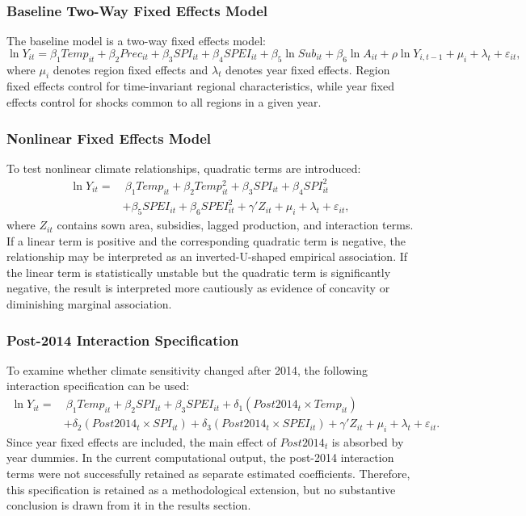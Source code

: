 \documentclass[12pt,a4paper]{article}
\begin{document}
\subsubsection{Baseline Two-Way Fixed Effects Model}

The baseline model is a two-way fixed effects model:
\[
\ln Y_{it}
=
\beta_1 Temp_{it}
+\beta_2 Prec_{it}
+\beta_3 SPI_{it}
+\beta_4 SPEI_{it}
+\beta_5 \ln Sub_{it}
+\beta_6 \ln A_{it}
+\rho \ln Y_{i,t-1}
+\mu_i+\lambda_t+\varepsilon_{it},
\]
where \(\mu_i\) denotes region fixed effects and \(\lambda_t\) denotes year fixed effects. Region fixed effects control for time-invariant regional characteristics, while year fixed effects control for shocks common to all regions in a given year.

\subsubsection{Nonlinear Fixed Effects Model}

To test nonlinear climate relationships, quadratic terms are introduced:
\[
\begin{aligned}
\ln Y_{it}
=&\ \beta_1 Temp_{it}
+\beta_2 Temp^2_{it}
+\beta_3 SPI_{it}
+\beta_4 SPI^2_{it} \\
&+\beta_5 SPEI_{it}
+\beta_6 SPEI^2_{it}
+\gamma'Z_{it}
+\mu_i+\lambda_t+\varepsilon_{it},
\end{aligned}
\]
where \(Z_{it}\) contains sown area, subsidies, lagged production, and interaction terms. If a linear term is positive and the corresponding quadratic term is negative, the relationship may be interpreted as an inverted-U-shaped empirical association. If the linear term is statistically unstable but the quadratic term is significantly negative, the result is interpreted more cautiously as evidence of concavity or diminishing marginal association.

\subsubsection{Post-2014 Interaction Specification}

To examine whether climate sensitivity changed after 2014, the following interaction specification can be used:
\[
\begin{aligned}
\ln Y_{it}
=&\ \beta_1 Temp_{it}
+\beta_2 SPI_{it}
+\beta_3 SPEI_{it}
+\delta_1(Post2014_t \times Temp_{it}) \\
&+\delta_2(Post2014_t \times SPI_{it})
+\delta_3(Post2014_t \times SPEI_{it})
+\gamma'Z_{it}
+\mu_i+\lambda_t+\varepsilon_{it}.
\end{aligned}
\]
Since year fixed effects are included, the main effect of \(Post2014_t\) is absorbed by year dummies. In the current computational output, the post-2014 interaction terms were not successfully retained as separate estimated coefficients. Therefore, this specification is retained as a methodological extension, but no substantive conclusion is drawn from it in the results section.
\end{document}
